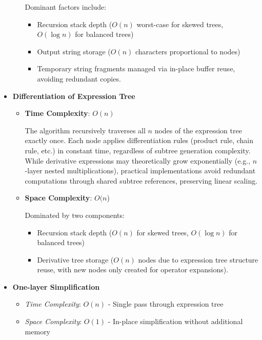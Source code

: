 \documentclass{report}
\begin{document}
\begin{itemize}
\begin{itemize}
        Dominant factors include:
        \begin{itemize}
            \item Recursion stack depth (\(O(n)\) worst-case for skewed trees, \(O(\log n)\) for balanced trees)
            \item Output string storage (\(O(n)\) characters proportional to nodes)
            \item Temporary string fragments managed via in-place buffer reuse, avoiding redundant copies.  
        \end{itemize}
    \end{itemize}

    \item \textbf{Differentiation of Expression Tree}
    \begin{itemize}
        \item \textbf{Time Complexity}: \(O(n)\)
        
        The algorithm recursively traverses all \(n\) nodes of the expression tree exactly once. Each node applies differentiation rules (product rule, chain rule, etc.) in constant time, regardless of subtree generation complexity. While derivative expressions may theoretically grow exponentially (e.g., \(n\)-layer nested multiplications), practical implementations avoid redundant computations through shared subtree references, preserving linear scaling.

        \item \textbf{Space Complexity}: \(O(n\))
        
        Dominated by two components:
        \begin{itemize}
            \item Recursion stack depth (\(O(n)\) for skewed trees, \(O(\log n)\) for balanced trees)
            \item Derivative tree storage (\(O(n)\) nodes due to expression tree structure reuse, with new nodes only created for operator expansions).
        \end{itemize}
    \end{itemize}

    \item \textbf{One-layer Simplification}
    \begin{itemize}
        \item \textit{Time Complexity}: $O(n)$ - Single pass through expression tree
        \item \textit{Space Complexity}: $O(1)$ - In-place simplification without additional memory
    \end{itemize}


\end{itemize}
\end{document}
